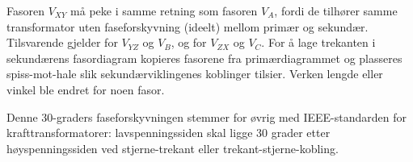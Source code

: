 





Fasoren $V_{XY}$ må peke i samme retning som fasoren $V_A$, fordi de tilhører samme transformator uten faseforskyvning (ideelt) mellom primær og sekundær. Tilsvarende gjelder for $V_{YZ}$ og $V_B$, og for $V_{ZX}$ og $V_C$. For å lage trekanten i sekundærens fasordiagram kopieres fasorene fra primærdiagrammet og plasseres spiss-mot-hale slik sekundærviklingenes koblinger tilsier. Verken lengde eller vinkel ble endret for noen fasor.

\vskip 10pt

Denne 30-graders faseforskyvningen stemmer for øvrig med IEEE-standarden for krafttransformatorer: lavspenningssiden skal ligge 30 grader etter høyspenningssiden ved stjerne-trekant eller trekant-stjerne-kobling.


